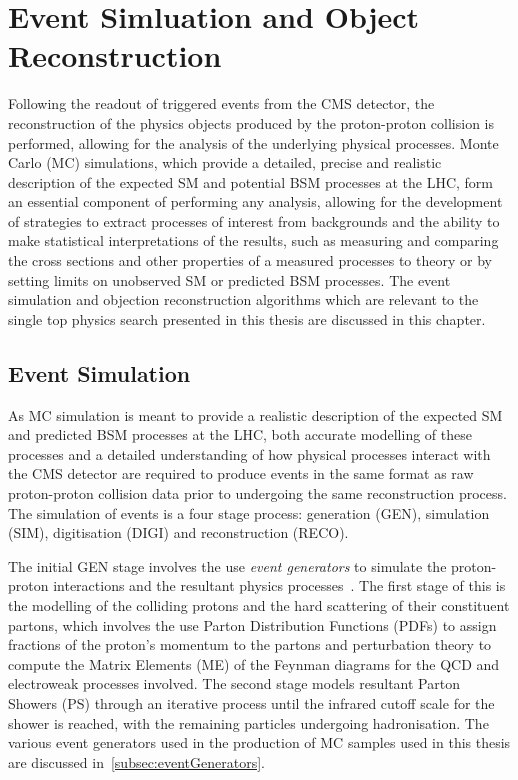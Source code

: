 \chapter{Event Simluation and Object Reconstruction}\label{chapter:data-mc}
Following the readout of triggered events from the CMS detector, the reconstruction of the physics objects produced by the proton-proton collision is performed, allowing for the analysis of the underlying physical processes.
Monte Carlo (MC) simulations, which provide a detailed, precise and realistic description of the expected SM and potential BSM processes at the LHC, form an essential component of performing any analysis, allowing for the development of strategies to extract processes of interest from backgrounds and the ability to make statistical interpretations of the results, such as measuring and comparing the cross sections and other properties of a measured processes to theory or by setting limits on unobserved SM or predicted BSM processes.
The event simulation and objection reconstruction algorithms which are relevant to the single top physics search presented in this thesis are discussed in this chapter.

\section{Event Simulation}\label{sec:sim}
As MC simulation is meant to provide a realistic description of the expected SM and predicted BSM processes at the LHC, 
both accurate modelling of these processes and a detailed understanding of how physical processes interact with the CMS detector are required to produce events in the same format as raw proton-proton collision data prior to undergoing the same reconstruction process.
The simulation of events is a four stage process: generation (GEN), simulation (SIM), digitisation (DIGI) and reconstruction (RECO).

The initial GEN stage involves the use \emph{event generators} to simulate the proton-proton interactions and the resultant physics processes~\cite{Buckley:2011ms,Hoche:2014rga}.
The first stage of this is the modelling of the colliding protons and the hard scattering of their constituent partons, which involves the use Parton Distribution Functions (PDFs) to assign fractions of the proton's momentum to the partons and perturbation theory to compute the Matrix Elements (ME) of the Feynman diagrams for the QCD and electroweak processes involved.
The second stage models resultant Parton Showers (PS) through an iterative process until the infrared cutoff scale for the shower is reached, with the remaining particles undergoing hadronisation.
The various event generators used in the production of MC samples used in this thesis are discussed in~\ref{subsec:eventGenerators}.


